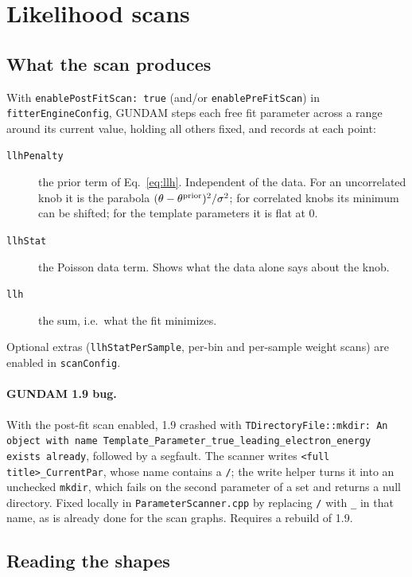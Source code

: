 \documentclass[11pt]{article}
\newcommand{\code}[1]{\texttt{#1}}
\begin{document}
\section{Likelihood scans}
\label{sec:scans}

\subsection{What the scan produces}

With \code{enablePostFitScan: true} (and/or \code{enablePreFitScan}) in
\code{fitterEngineConfig}, GUNDAM steps each free fit parameter across a range
around its current value, holding all others fixed, and records at each point:

\begin{description}
  \item[\code{llhPenalty}] the prior term of Eq.~\eqref{eq:llh}. Independent of the
    data. For an uncorrelated knob it is the parabola $(\theta-\theta^{\rm prior})^2/\sigma^2$;
    for correlated knobs its minimum can be shifted; for the template
    parameters it is flat at 0.
  \item[\code{llhStat}] the Poisson data term. Shows what the data alone says
    about the knob.
  \item[\code{llh}] the sum, i.e.\ what the fit minimizes.
\end{description}
Optional extras (\code{llhStatPerSample}, per-bin and per-sample weight scans)
are enabled in \code{scanConfig}.

\paragraph{GUNDAM 1.9 bug.} With the post-fit scan enabled, 1.9 crashed with
\code{TDirectoryFile::mkdir: An object with name
Template\_Parameter\_true\_leading\_electron\_energy exists already}, followed by a
segfault. The scanner writes \code{<full title>\_CurrentPar}, whose name contains
a \code{/}; the write helper turns it into an unchecked \code{mkdir}, which fails
on the second parameter of a set and returns a null directory. Fixed locally in
\code{ParameterScanner.cpp} by replacing \code{/} with \code{\_} in that name, as is
already done for the scan graphs. Requires a rebuild of 1.9.

\subsection{Reading the shapes}
\end{document}

